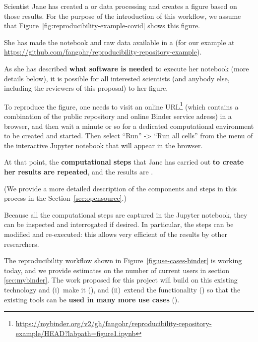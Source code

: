 \begin{compactitem}
\item Scientist Jane has created a  or
  data processing and creates a figure based on those results. For the purpose
  of the introduction of this workflow, we assume that
  Figure~\ref{fig:reproducibility-example-covid} shows this figure.

\item She has made the notebook and raw data available in a 
  (for our example at\newline
  \mbox{\url{https://github.com/fangohr/reproducibility-repository-example}}).

\item As she has described \textbf{what software is needed} to execute her notebook (more
  details below), it is possible for all interested scientists (and anybody
  else, including the reviewers of this proposal) to  her
  figure.

  To reproduce the figure, one needs to visit an online 
  URL\footnote{\url{https://mybinder.org/v2/gh/fangohr/reproducibility-repository-example/HEAD?labpath=figure1.ipynb}}
  (which contains a combination of the public repository and online Binder service adress) 
  in a browser, and then wait a minute or so for a dedicated computational
  environment to be created and started. Then select ``Run'' -> ``Run all cells''
  from the menu of the interactive Jupyter notebook that will appear in the
  browser.


  At that point, the \textbf{computational steps} that Jane has carried out
  \textbf{to create her
  results are repeated}, and the results are .

  (We provide a more detailed description of the components and steps in this
  process in the Section~\ref{sec:opensource}.)

\item Because all the computational steps are captured in the Jupyter notebook,
  they can be inspected and interrogated if desired. In particular, the steps
  can be modified and re-executed: this allows very efficient  of
  the results by other researchers.
\end{compactitem}


The reproducibility workflow shown in Figure~\ref{fig:use-cases-binder} is
working today, and we provide estimates on the number of current users in
section \ref{sec:mybinder}. The work proposed for this project will build on
this existing technology and (i)~make it 
(), and (ii)~extend the functionality () so
that the existing tools can be \textbf{used in many more use cases}
().


